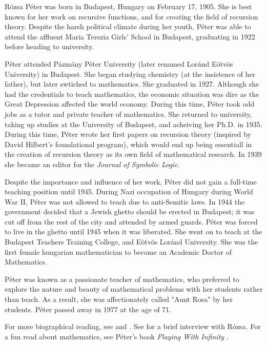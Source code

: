 \documentclass[../../../include/open-logic-section]{subfiles}
\begin{document}


R\'{o}zsa P\'{e}ter was born in Budapest,
Hungary on February 17, 1905. She is best known for her work on recursive
functions, and for creating the field of recursion theory. Despite the
harsh political climate during her youth, P\'{e}ter was able to attend the affluent
Maria Terezia Girls' School in Budapest, graduating in 1922 before heading
to university.

P\'{e}ter attended P\'{a}zm\'{a}ny P\'{e}ter University (later renamed
 Lor\'{a}nd E\"{o}tv\"{o}s University) in Budapest. She began studying 
 chemistry (at the insistence of her father), but later swtiched to mathematics. 
 She graduated in 1927. Although she had the credentials to teach mathematics,
  the economic situation was dire as the Great Depression affected 
  the world economy.  During this time, P\'{e}ter
took odd jobs as a tutor and private teacher of mathematics. She returned
to university, taking up studies at the University of Budapest, and acheiving
her Ph.D. in 1935. During this time, P\'{e}ter wrote her first papers on
recursion theory (inspired by David Hilbert's foundational program), which
would end up being essentiall in the creation of recursion theory as its own
field of mathematical research. In 1939 she became an editor for the
\emph{Journal of Symbolic Logic}.

Despite the importance and influence of her work, P\'{e}ter did not gain a
full-time teaching position until 1945. During Nazi occupation of Hungary
during World War II, P\'{e}ter was not allowed to teach due to anti-Semitic
laws. In 1944 the government decided that a Jewish ghetto should be
erected in Budapest; it was cut off from the rest of the city and attended
by armed guards. P\'{e}ter was forced to live in the ghetto until 1945 when it
was liberated. She went on to teach at the Budapest Teachers Training
College, and E\"{o}tv\"{o}s Lor\'{a}nd University. She was the first female hungarian
mathematician to become an Academic Doctor of Mathematics.

P\'{e}ter was known as a passionate teacher of mathematics, who preferred to
explore the nature and beauty of mathematical problems with her students
rather than teach. As a result, she was affectionately called "Aunt Rosa"
by her students. P\'{e}ter passed away in 1977 at the age of 71.

\begin{reading} 
For more biographical reading, see \citet{Oconnor2014} and \citet{Andrasfai1986}.
See \citet{Tamassy1994} for a brief interview with R\'{o}zsa. For a fun read
about mathematics, see P\'{e}ter's book \emph{Playing With Infinity} 
\citep{Peter2010}.
\end{reading}
\end{document}
